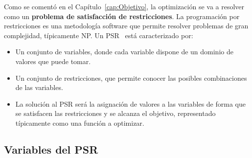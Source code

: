 Como se comentó en el Capítulo~\ref{cap:Objetivo}, la optimización se va a resolver como un \textbf{problema de satisfacción de restricciones}. La programación por restricciones es una metodología software que permite resolver problemas de gran complejidad, típicamente NP. Un \gls{PSR}~\cite{Russ06} está caracterizado por:
\begin{itemize}
	\item Un conjunto de variables, donde cada variable dispone de un dominio de valores que puede tomar.
	\item Un conjunto de restricciones, que permite conocer las posibles combinaciones de las variables.
	\item La solución al PSR será la asignación de valores a las variables de forma que se satisfacen las restricciones y se alcanza el objetivo, representado típicamente como una función a optimizar.
\end{itemize}

\subsection{Variables del PSR}

